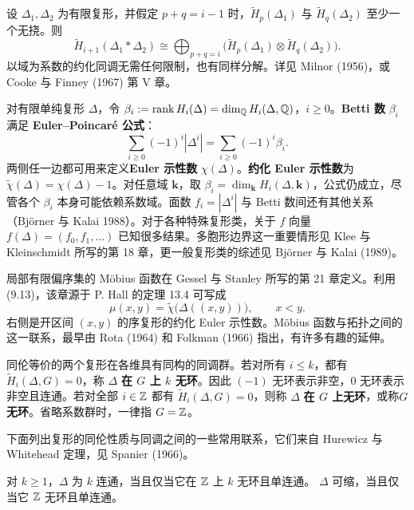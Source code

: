 设 $\Delta_1,\Delta_2$ 为有限复形，并假定 $p+q=i-1$ 时，$\widetilde H_p(\Delta_1)$ 与 $\widetilde H_q(\Delta_2)$ 至少一个无挠。则
\begin{equation}
\widetilde H_{i+1}(\Delta_1*\Delta_2)
\cong\bigoplus_{p+q=i}\big(\widetilde H_p(\Delta_1)\otimes\widetilde H_q(\Delta_2)\big).
\tag{9.12}
\end{equation}
以域为系数的约化同调无需任何限制，也有同样分解。详见 Milnor (1956)，或 Cooke 与 Finney (1967) 第 V 章。

对有限单纯复形 $\Delta$，令 $\beta_i:=\operatorname{rank}H_i(\Delta)=\dim_\mathbb Q H_i(\Delta,\mathbb Q)$，$i\ge0$。\textbf{Betti 数} $\beta_i$ 满足 \textbf{Euler--Poincaré 公式}：
\begin{equation}
\sum_{i\ge0}(-1)^i|\Delta^i|=\sum_{i\ge0}(-1)^i\beta_i.\tag{9.13}
\end{equation}
两侧任一边都可用来定义\textbf{Euler 示性数} $\chi(\Delta)$。\textbf{约化 Euler 示性数}为 $\widetilde\chi(\Delta)=\chi(\Delta)-1$。对任意域 $\mathbf k$，取 $\beta_i=\dim_{\mathbf k}H_i(\Delta,\mathbf k)$，公式仍成立，尽管各个 $\beta_i$ 本身可能依赖系数域。面数 $f_i=|\Delta^i|$ 与 Betti 数间还有其他关系（Björner 与 Kalai 1988）。对于各种特殊复形类，关于 $f$ 向量 $f(\Delta)=(f_0,f_1,\ldots)$ 已知很多结果。多胞形边界这一重要情形见 Klee 与 Kleinschmidt 所写的第 18 章，更一般复形类的综述见 Björner 与 Kalai (1989)。

局部有限偏序集的 Möbius 函数在 Gessel 与 Stanley 所写的第 21 章定义。利用 (9.13)，该章源于 P. Hall 的定理 13.4 可写成
\begin{equation}
\mu(x,y)=\widetilde\chi\big(\Delta((x,y))\big),\qquad x<y.\tag{9.14}
\end{equation}
右侧是开区间 $(x,y)$ 的序复形的约化 Euler 示性数。Möbius 函数与拓扑之间的这一联系，最早由 Rota (1964) 和 Folkman (1966) 指出，有许多有趣的延伸。

同伦等价的两个复形在各维具有同构的同调群。若对所有 $i\le k$，都有 $\widetilde H_i(\Delta,G)=0$，称 $\Delta$ \textbf{在 $G$ 上 $k$ 无环}。因此 $(-1)$ 无环表示非空，0 无环表示非空且连通。若对全部 $i\in\mathbb Z$ 都有 $\widetilde H_i(\Delta,G)=0$，则称 $\Delta$ \textbf{在 $G$ 上无环}，或称\textbf{$G$ 无环}。省略系数群时，一律指 $G=\mathbb Z$。

下面列出复形的同伦性质与同调之间的一些常用联系，它们来自 Hurewicz 与 Whitehead 定理，见 Spanier (1966)。

对 $k\ge1$，$\Delta$ 为 $k$ 连通，当且仅当它在 $\mathbb Z$ 上 $k$ 无环且单连通。
$\Delta$ 可缩，当且仅当它 $\mathbb Z$ 无环且单连通。

